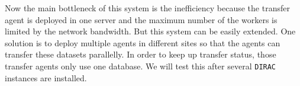 Now the main bottleneck of this system is the inefficiency because 
the transfer agent is deployed in one server and the maximum number of 
the workers is limited by the network bandwidth.
But this system can be easily extended.
One solution is to deploy multiple agents in different sites
so that the agents can transfer these datasets parallelly.
In order to keep up transfer status,
those transfer agents only use one database.
We will test this after several {\tt DIRAC} instances are installed.
